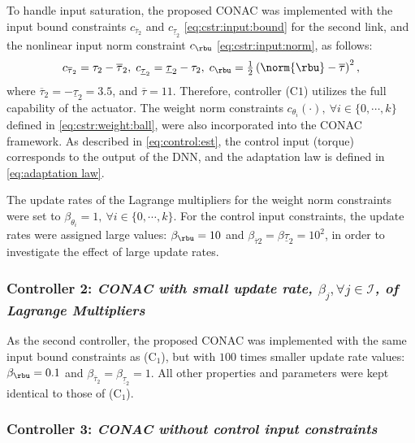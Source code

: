 \documentclass[journal]{IEEEtran}
\begin{document}
To handle input saturation, the proposed CONAC was implemented with the input bound constraints $c_{\overline\tau_2}$ and $c_{\underline\tau_2}$ \eqref{eq:cstr:input:bound} for the second link, and the nonlinear input norm constraint $c_{\rbu}$ \eqref{eq:cstr:input:norm}, as follows:
\begin{equation}
    c_{\overline\tau_2}     
    =
    \tau_2-\overline\tau_2
    ,
    \;
    c_{\underline\tau_2} 
    =
    \underline\tau_2-\tau_2
    ,
    \;
    c_{\rbu}
    =
    \tfrac{1}{2}
    \left(
        \norm{\rbu}-\overline\tau
    \right)^2 
    ,
    \label{eq:sim:cstr:CONAC}
\end{equation}
where $\overline\tau_2=-\underline{\tau}_2=3.5$, and $\overline\tau=11$.
Therefore, controller (C$1$) utilizes the full capability of the actuator.
The weight norm constraints $c_{\theta_i}(\cdot),\ \forall i\in\{0,\cdots,k\}$ defined in \eqref{eq:cstr:weight:ball}, were also incorporated into the CONAC framework.
As described in \eqref{eq:control:est}, the control input (torque) corresponds to the output of the DNN, and the adaptation law is defined in \eqref{eq:adaptation law}.

The update rates of the Lagrange multipliers for the weight norm constraints were set to $\beta_{\theta_i}=1,\ \forall i\in\{0,\cdots,k\}$.
For the control input constraints, the update rates were assigned large values: $\beta_{\rbu} = 10$ and $\beta_{\overline{\tau}2} = \beta{\underline{\tau}_2} = 10^2$, in order to investigate the effect of large update rates.

\subsubsection*{Controller 2:  \textit{CONAC with small update rate, $\beta_j,\forall j\in\mathcal{I}$, of Lagrange Multipliers}}

As the second controller, the proposed CONAC was implemented with the same input bound constraints as (C$_1$), but with $100$ times smaller update rate values: $\beta_{\rbu}=0.1$ and $\beta_{\overline{\tau}_2}=\beta_{\underline{\tau}_2}=1$.
All other properties and parameters were kept identical to those of (C$_1$).

\subsubsection*{Controller 3:  \textit{CONAC without control input constraints}}
\end{document}
